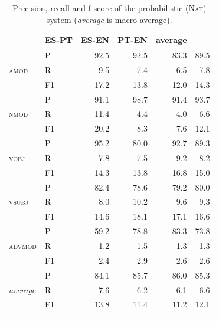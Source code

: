 \documentclass[output=paper
,modfonts
,nonflat]{langsci/langscibook}
\begin{document}
\begin{table}
  \begin{center}
    \caption{\label{tab:nat} Precision, recall and f-score of the probabilistic (\textsc{Nat}) system (\emph{average} is macro-average).}
    \begin{tabular}{llrrrr}
      \lsptoprule
      \multicolumn{2}{l}{\textbf{Pattern}} & \textbf{ES-PT} & \textbf{ES-EN} & \textbf{PT-EN} & \textbf{average}\\
      \midrule
	\multirow{3}{*}{\textsc{amod}} & P & 92.5 & 92.5 & 83.3 & 89.5\\
	& R & 9.5 & 7.4 & 6.5 & 7.8\\
	& F1 & 17.2 & 13.8 & 12.0 & 14.3\\ \midrule
	\multirow{3}{*}{\textsc{nmod}} & P & 91.1 & 98.7 & 91.4 & 93.7\\
	& R & 11.4 & 4.4 & 4.0 & 6.6\\
	& F1 & 20.2 & 8.3 & 7.6 & 12.1\\ \midrule
	\multirow{3}{*}{\textsc{vobj}} & P & 95.2 & 80.0 & 92.7 & 89.3\\
	& R & 7.8 & 7.5 & 9.2 & 8.2\\
	& F1 & 14.3 & 13.8 & 16.8 & 15.0\\ \midrule
	\multirow{3}{*}{\textsc{vsubj}} & P & 82.4 & 78.6 & 79.2 & 80.0\\
	& R & 8.0 & 10.2 & 9.6 & 9.3\\
	& F1 & 14.6 & 18.1 & 17.1 & 16.6\\ \midrule
	\multirow{3}{*}{\textsc{advmod}} & P & 59.2 & 78.8 & 83.3 & 73.8\\
	& R & 1.2 & 1.5 & 1.3 & 1.3\\
	& F1 & 2.4 & 2.9 & 2.6 & 2.6\\ \midrule
	\multirow{3}{*}{\emph{average}} & P & 84.1 & 85.7 & 86.0 & 85.3\\
	& R & 7.6 & 6.2 & 6.1 & 6.6\\
	& F1 & 13.8 & 11.4 & 11.2 & 12.1\\
      \lspbottomrule
    \end{tabular}
  \end{center}
\end{table}
\end{document}
